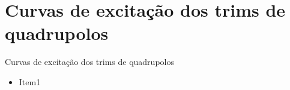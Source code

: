 \section{Curvas de excitação dos trims de quadrupolos}


\begin{frame}{Curvas de excitação dos trims de quadrupolos}

{\footnotesize
\begin{itemize}
    \item Item1
\end{itemize}
}
\vspace{-0.2cm}
\end{frame}
